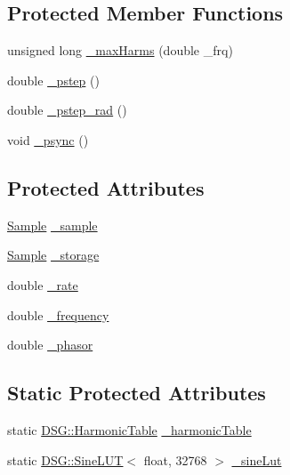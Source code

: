 \subsection*{Protected Member Functions}
\begin{DoxyCompactItemize}
\item 
unsigned long \hyperlink{classDSG_1_1FourierGenerator_a6b6e3bbad8ff7443d9ed71f4cdf76739}{\+\_\+max\+Harms} (double \+\_\+frq)
\item 
double \hyperlink{classDSG_1_1SignalGenerator_ac0d781b8673b3a283bf7c133290ede50}{\+\_\+pstep} ()
\item 
double \hyperlink{classDSG_1_1SignalGenerator_ae660eb4caa88b8d278f8d24d0908a487}{\+\_\+pstep\+\_\+rad} ()
\item 
void \hyperlink{classDSG_1_1SignalGenerator_a05baccb38d1e52860d4fcf7cb8430efc}{\+\_\+psync} ()
\end{DoxyCompactItemize}
\subsection*{Protected Attributes}
\begin{DoxyCompactItemize}
\item 
\hyperlink{classDSG_1_1Sample}{Sample} \hyperlink{classDSG_1_1FourierGenerator_ab96bed1cd59c42e82a689036e5c62bef}{\+\_\+sample}
\item 
\hyperlink{classDSG_1_1Sample}{Sample} \hyperlink{classDSG_1_1FourierGenerator_a6b7f2439b26914cc9df6b6975a2cedac}{\+\_\+storage}
\item 
double \hyperlink{classDSG_1_1SignalGenerator_aa10f6c85d9adee901139ea7fb346f39d}{\+\_\+rate}
\item 
double \hyperlink{classDSG_1_1SignalGenerator_a67e296e3506dcdf09402c667cddff9ac}{\+\_\+frequency}
\item 
double \hyperlink{classDSG_1_1SignalGenerator_ac2271b582bf699275f077ecb642a8cd9}{\+\_\+phasor}
\end{DoxyCompactItemize}
\subsection*{Static Protected Attributes}
\begin{DoxyCompactItemize}
\item 
static \hyperlink{classDSG_1_1HarmonicTable}{D\+S\+G\+::\+Harmonic\+Table} \hyperlink{classDSG_1_1FourierGenerator_a7288408f8e44d5edb5eecc62480243d7}{\+\_\+harmonic\+Table}
\item 
static \hyperlink{classDSG_1_1SineLUT}{D\+S\+G\+::\+Sine\+L\+U\+T}$<$ float, 32768 $>$ \hyperlink{classDSG_1_1FourierGenerator_a1ae5fb243ce05e638bdf0dec8bde7426}{\+\_\+sine\+Lut}
\end{DoxyCompactItemize}



